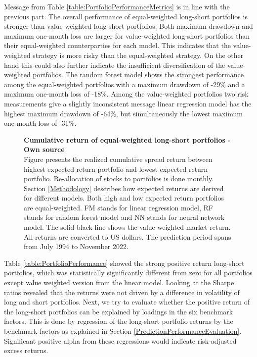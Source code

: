 \documentclass[12pt]{article}
\begin{document}
Message from Table \ref{table:PortfolioPerformanceMetrics} is in line with the previous part. The overall performance of equal-weighted long-short portfolios is stronger than value-weighted long-short portfolios. Both maximum drawdown and maximum one-month loss are larger for value-weighted long-short portfolios than their equal-weighted counterparties for each model. This indicates that the value-weighted strategy is more risky than the equal-weighted strategy. On the other hand this could also further indicate the insufficient diversification of the value-weighted portfolios. The random forest model shows the strongest performance among the equal-weighted portfolios with a maximum drawdown of -29\% and a maximum one-month loss of -18\%. Among the value-weighted portfolios two risk measurements give a slightly inconsistent message linear regression model has the highest maximum drawdown of -64\%, but simultaneously the lowest maximum one-month loss of -31\%. \par

\begin{figure}[ht]
\centering
\caption[Cumulative return of equal-weighted long-short portfolios]{\textbf{Cumulative return of equal-weighted long-short portfolios \textnormal{- Own source}}\\ Figure presents the realized cumulative spread return between highest expected return portfolio and lowest expected return portfolio. Re-allocation of stocks to portfolios is done monthly. Section \ref{Methodology} describes how expected returns are derived for different models. Both high and low expected return portfolios are equal-weighted. FM stands for linear regression model, RF stands for random forest model and NN stands for neural network model. The solid black line shows the value-weighted market return. All returns are converted to US dollars. The prediction period spans from July 1994 to November 2022.}

\label{plot:cumul_ew_LS_portf_return}
\end{figure}

Table \ref{table:PortfolioPerformance} showed the strong positive return long-short portfolios, which was statistically significantly different from zero for all portfolios except value weighted version from the linear model. Looking at the Sharpe ratios revealed that the returns were not driven by a difference in volatility of long and short portfolios. Next, we try to evaluate whether the positive return of the long-short portfolios can be explained by loadings in the six benchmark factors. This is done by regression of the long-short portfolio returns by the benchmark factors as explained in Section \ref{PredictionPerformanceEvaluation}. Significant positive alpha from these regressions would indicate risk-adjusted excess returns. \par
\end{document}
